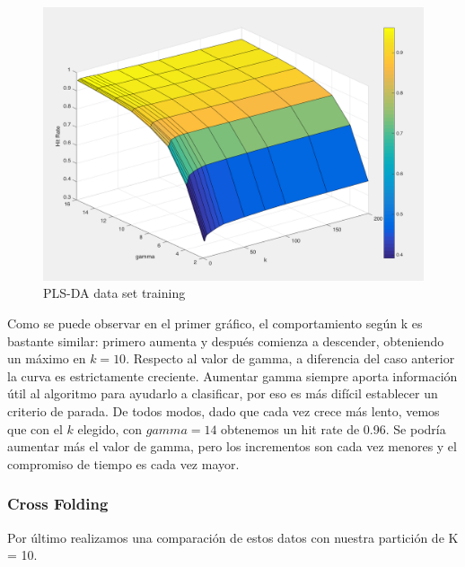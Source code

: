 \begin{figure}[h!]
  \begin{center}
	\includegraphics[scale=0.5]{exp2/PLS-HitRate-1.png}
	\caption{PLS-DA data set training}
  \end{center}
\end{figure}

Como se puede observar en el primer gráfico, el comportamiento según k es bastante similar: primero aumenta y después comienza a descender, obteniendo un máximo en $k = 10$. 
Respecto al valor de gamma, a diferencia del caso anterior la curva es estrictamente creciente. Aumentar gamma siempre aporta información útil al algoritmo para ayudarlo a clasificar, por eso es más difícil establecer un criterio de parada. De todos modos, dado que cada vez crece más lento, vemos que con el $k$ elegido, con $gamma = 14$ obtenemos un hit rate de 0.96. Se podría aumentar más el valor de gamma, pero los incrementos son cada vez menores y el compromiso de tiempo es cada vez mayor.


\subsubsection{Cross Folding}

Por último realizamos una comparación de estos datos con nuestra partición de K = 10.

